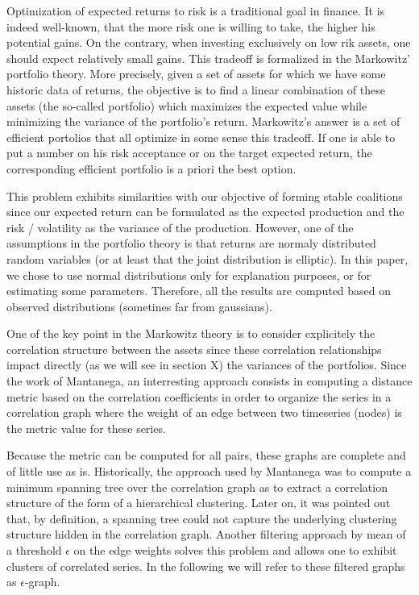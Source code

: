 \documentclass[conference]{IEEEtran}
\begin{document}
Optimization of expected returns to risk is a traditional goal in finance. It is indeed well-known, that the more risk one is willing to take, the higher his potential gains. On the contrary, when investing exclusively on low rik assets, one should expect relatively small gains. This tradeoff is formalized in the Markowitz' portfolio theory. More precisely, given a set of assets for which we have some historic data of returns, the objective is to find a linear combination of these assets (the so-called portfolio) which maximizes the expected value while minimizing the variance of the portfolio's return. Markowitz's answer is a set of efficient portolios that all optimize in some sense this tradeoff. If one is able to put a number on his risk acceptance or on the target expected return, the corresponding efficient portfolio is a priori the best option. 

This problem exhibits similarities with our objective of forming stable coalitions since our expected return can be formulated as the expected production and the risk / volatility as the variance of the production. However, one of the assumptions in the portfolio theory is that returns are normaly distributed random variables (or at least that the joint distribution is elliptic). In this paper, we chose to use normal distributions only for explanation purposes, or for estimating some parameters. Therefore, all the results are computed based on observed distributions (sometines far from gaussians).

One of the key point in the Markowitz theory is to consider explicitely the correlation structure between the assets since these correlation relationships impact directly (as we will see in section X) the variances of the portfolios. Since the work of Mantanega, an interresting approach consists in computing a distance metric based on the correlation coefficients in order to organize the series in a correlation graph where the weight of an edge between two timeseries (nodes) is the metric value for these series.

Because the metric can be computed for all pairs, these graphs are complete and of little use as is. Historically, the approach used by Mantanega was to compute a minimum spanning tree over the correlation graph as to extract a correlation structure of the form of a hierarchical clustering. Later on, it was pointed out that, by definition, a spanning tree could not capture the underlying clustering structure hidden in the correlation graph. Another filtering approach by mean of a threshold $ \epsilon $ on the edge weights solves this problem and allows one to exhibit clusters of correlated series. In the following we will refer to these filtered graphs as $ \epsilon $-graph.
\end{document}
